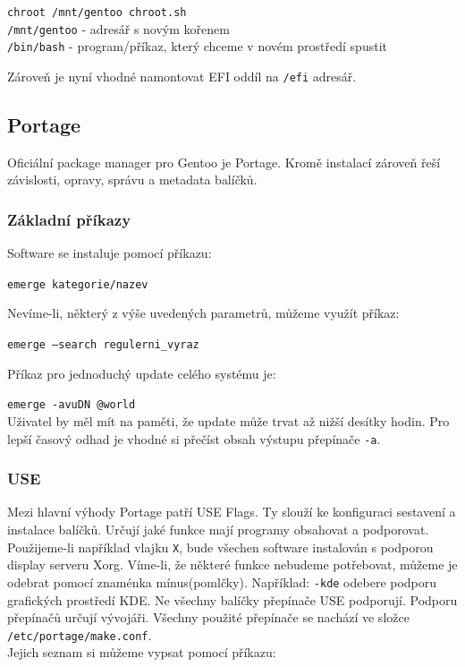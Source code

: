 \documentclass[12pt,a4paper,twoside,]{article}
\begin{document}
{\texttt{chroot /mnt/gentoo chroot.sh}\\
\texttt{/mnt/gentoo} - adresář s novým kořenem\\
\texttt{/bin/bash} - program/příkaz, který chceme v novém prostředí spustit

\hspace*{-1.5em}Zároveň je nyní vhodné namontovat EFI oddíl na \texttt{/efi} adresář.

\subsection{Portage}
Oficiální package manager pro Gentoo je Portage. Kromě instalací zároveň řeší závislosti, opravy, správu a metadata balíčků.
\subsubsection{Základní příkazy}
Software se instaluje pomocí příkazu:  

 \texttt{emerge kategorie/nazev} 
 
\hspace*{-1.5em}Nevíme-li, některý z výše uvedených parametrů, můžeme využít příkaz:

\texttt{emerge --search regulerni\_vyraz} 

\hspace*{-1.5em}Příkaz pro jednoduchý update celého systému je:

\texttt{emerge -avuDN @world}\\

\hspace*{-1.5em}Uživatel by měl mít na paměti, že update může trvat až nižší desítky hodin. Pro lepší časový odhad je vhodné si přečíst obsah výstupu přepínače \texttt{-a}. %
\newpage
\subsubsection{USE}
Mezi hlavní výhody Portage patří USE Flags. Ty slouží ke konfiguraci sestavení a instalace balíčků. Určují jaké funkce mají programy obsahovat a podporovat.\\
Použijeme-li například vlajku \texttt{X}, bude všechen software instalován s podporou display serveru Xorg. Víme-li, že některé funkce nebudeme potřebovat, můžeme je odebrat pomocí znaménka mínus(pomlčky). Například: \texttt{-kde} odebere podporu grafických prostředí KDE.
Ne všechny balíčky přepínače USE podporují. Podporu přepínačů určují vývojáři.
Všechny použité přepínače se nachází ve složce \texttt{/etc/portage/make.conf}. \\
Jejich seznam si můžeme vypsat pomocí příkazu:

}
\end{document}
